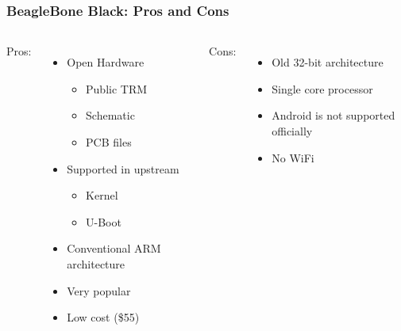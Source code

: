 \begin{frame}
  \frametitle{BeagleBone Black: Pros and Cons}
  \begin{columns}[t]
    Pros:
    \begin{itemize}
    \item Open Hardware
      \begin{itemize}
      \item Public TRM
      \item Schematic
      \item PCB files
      \end{itemize}
    \item Supported in upstream
      \begin{itemize}
      \item Kernel
      \item U-Boot
      \end{itemize}
    \item Conventional ARM architecture
    \item Very popular
    \item Low cost (\$55)
    \end{itemize}

    Cons:
    \begin{itemize}
    \item Old 32-bit architecture
    \item Single core processor
    \item Android is not supported officially
    \item No WiFi
    \end{itemize}
  \end{columns}
\end{frame}

